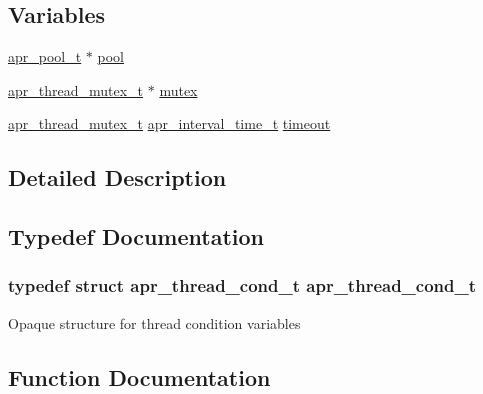 \subsection*{Variables}
\begin{DoxyCompactItemize}
\item 
\hyperlink{structapr__pool__t}{apr\+\_\+pool\+\_\+t} $\ast$ \hyperlink{group__apr__thread__cond_ga35230907c170df5d4d7f0ca99274c574}{pool}
\item 
\hyperlink{structapr__thread__mutex__t}{apr\+\_\+thread\+\_\+mutex\+\_\+t} $\ast$ \hyperlink{group__apr__thread__cond_ga9b5d997217b2ae4c884c535811cb6e35}{mutex}
\item 
\hyperlink{structapr__thread__mutex__t}{apr\+\_\+thread\+\_\+mutex\+\_\+t} \hyperlink{group__apr__time_gaae2129185a395cc393f76fabf4f43e47}{apr\+\_\+interval\+\_\+time\+\_\+t} \hyperlink{group__apr__thread__cond_ga58459b17720e15365dbe11e8395563fc}{timeout}
\end{DoxyCompactItemize}


\subsection{Detailed Description}


\subsection{Typedef Documentation}
\subsubsection[{\texorpdfstring{apr\+\_\+thread\+\_\+cond\+\_\+t}{apr_thread_cond_t}}]{\setlength{\rightskip}{0pt plus 5cm}typedef struct {\bf apr\+\_\+thread\+\_\+cond\+\_\+t} {\bf apr\+\_\+thread\+\_\+cond\+\_\+t}}\hypertarget{group__apr__thread__cond_gae8f918d38bf1c58bc09670eee456ae5e}{}\label{group__apr__thread__cond_gae8f918d38bf1c58bc09670eee456ae5e}
Opaque structure for thread condition variables 

\subsection{Function Documentation}
